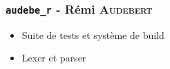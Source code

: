 \subsubsection{\texttt{audebe\_r} - Rémi \textsc{Audebert}}

\begin{itemize}
    \item Suite de tests et système de build
    \item Lexer et parser
\end{itemize}
